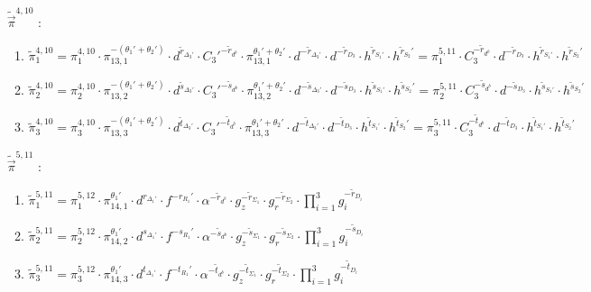 \begin{enumerate}
\begin{enumerate}
  \end{enumerate}
\item[$\tilde{\vec{\pi}}^{4,10}$]:
  \begin{enumerate}
  \item $\tilde{\pi}^{4,10}_1 = \pi^{4,10}_1 \cdot \pi_{13,1}^{-(\theta_1'+\theta_2')} \cdot d^{\tilde{r}_{\Delta_3'}} \cdot C_3'^{-\tilde{r}_{d^b}} \cdot \pi_{13,1}^{\theta_1'+ \theta_2'} \cdot d^{-\tilde{r}_{\Delta_3'}} \cdot d^{-\tilde{r}_{D_3}} \cdot h^{\tilde{r}_{S_1'}} \cdot h^{\tilde{r}_{S_2}'} = \pi^{5,11}_1 \cdot C_3^{-\tilde{r}_{d^b}} \cdot d^{-\tilde{r}_{D_3}} \cdot h^{\tilde{r}_{S_1'}} \cdot h^{\tilde{r}_{S_2}'}$
  \item $\tilde{\pi}^{4,10}_2 = \pi^{4,10}_2 \cdot \pi_{13,2}^{-(\theta_1'+\theta_2')} \cdot d^{\tilde{s}_{\Delta_3'}} \cdot C_3'^{-\tilde{s}_{d^b}} \cdot \pi_{13,2}^{\theta_1'+ \theta_2'} \cdot d^{-\tilde{s}_{\Delta_3'}} \cdot d^{-\tilde{s}_{D_3}} \cdot h^{\tilde{s}_{S_1'}} \cdot h^{\tilde{s}_{S_2}'} = \pi^{5,11}_2 \cdot C_3^{-\tilde{s}_{d^b}} \cdot d^{-\tilde{s}_{D_3}} \cdot h^{\tilde{s}_{S_1'}} \cdot h^{\tilde{s}_{S_2}'}$
  \item $\tilde{\pi}^{4,10}_3 = \pi^{4,10}_3 \cdot \pi_{13,3}^{-(\theta_1'+\theta_2')} \cdot d^{\tilde{t}_{\Delta_3'}} \cdot C_3'^{-\tilde{t}_{d^b}} \cdot \pi_{13,3}^{\theta_1'+ \theta_2'} \cdot d^{-\tilde{t}_{\Delta_3'}} \cdot d^{-\tilde{t}_{D_3}} \cdot h^{\tilde{t}_{S_1'}} \cdot h^{\tilde{t}_{S_2}'} = \pi^{5,11}_3 \cdot C_3^{-\tilde{t}_{d^b}} \cdot d^{-\tilde{t}_{D_3}} \cdot h^{\tilde{t}_{S_1'}} \cdot h^{\tilde{t}_{S_2}'}$
  \end{enumerate}
\item[$\tilde{\vec{\pi}}^{5,11}$]:
  \begin{enumerate}
  \item $\tilde{\pi}^{5,11}_1 = \pi^{5,12}_1 \cdot \pi_{14,1}^{\theta_1'} \cdot d^{r_{\Delta_1'}} \cdot f^{-r_{R_1}'} \cdot \alpha^{-\tilde{r}_{d^b}} \cdot g_z^{-\tilde{r}_{\Sigma_1}} \cdot g_r^{-\tilde{r}_{\Sigma_2}}\cdot \prod_{i = 1}^3 g_i^{-\tilde{r}_{D_i}}$
  \item $\tilde{\pi}^{5,11}_2 = \pi^{5,12}_2 \cdot \pi_{14,2}^{\theta_1'} \cdot d^{s_{\Delta_1'}} \cdot f^{-s_{R_1}'} \cdot \alpha^{-\tilde{s}_{d^b}} \cdot g_z^{-\tilde{s}_{\Sigma_1}} \cdot g_r^{-\tilde{s}_{\Sigma_2}}\cdot \prod_{i = 1}^3 g_i^{-\tilde{s}_{D_i}}$
  \item $\tilde{\pi}^{5,11}_3 = \pi^{5,12}_3 \cdot \pi_{14,3}^{\theta_1'} \cdot d^{t_{\Delta_1'}} \cdot f^{-t_{R_1}'} \cdot \alpha^{-\tilde{t}_{d^b}} \cdot g_z^{-\tilde{t}_{\Sigma_1}} \cdot g_r^{-\tilde{t}_{\Sigma_2}}\cdot \prod_{i = 1}^3 g_i^{-\tilde{t}_{D_i}}$

\end{enumerate}
\end{enumerate}
